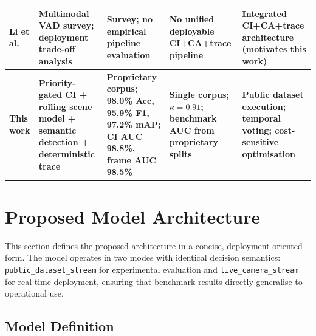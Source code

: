 \documentclass[sensors,article,submit,pdftex,moreauthors]{Definitions/mdpi}
\begin{document}
\begin{table}[H]
\begin{tabularx}{\linewidth}{p{1.8cm} p{3.2cm} p{2.6cm} p{2.6cm} p{2.6cm}}
Li et al.~\cite{li2024multimodal}
  & Multimodal VAD survey; deployment trade-off analysis
  & Survey; no empirical pipeline evaluation
  & No unified deployable CI+CA+trace pipeline
  & Integrated CI+CA+trace architecture (motivates this work) \\
 
\midrule
 
\textbf{This work}
  & \textbf{Priority-gated CI + rolling scene model + semantic detection + deterministic trace}
  & \textbf{Proprietary corpus; 98.0\% Acc, 95.9\% F1, 97.2\% mAP; CI AUC 98.8\%, frame AUC 98.5\%}
  & \textbf{Single corpus; $\kappa{=}0.91$; benchmark AUC from proprietary splits}
  & \textbf{Public dataset execution; temporal voting; cost-sensitive optimisation} \\
 
\bottomrule
\end{tabularx}
\end{table}
\section{Proposed Model Architecture}
\label{sec:proposedmodel}
 
This section defines the proposed architecture in a concise, deployment-oriented form. The model operates in two modes with identical decision semantics: \texttt{public\_dataset\_stream} for experimental evaluation and \texttt{live\_camera\_stream} for real-time deployment, ensuring that benchmark results directly generalise to operational use.
 
\subsection{Model Definition}
\label{sec:model}
 
\end{document}
